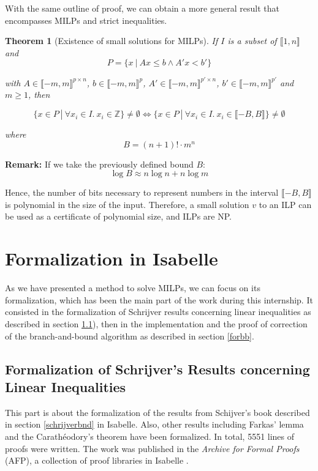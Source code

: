 \documentclass{article}
\newcommand{\ints}{\mathbb{Z}}
\newtheorem{theorem}{Theorem}
\begin{document}
With the same outline of proof, we can obtain a more general result that
encompasses MILPs and strict inequalities. 

\begin{theorem}[Existence of small solutions for MILPs]
  \label{small-milp}
  If $I$ is a subset of $\llbracket 1, n \rrbracket$ and
  $$P = \{x~|~Ax \leqslant b \wedge A'x < b'\}$$
  
  with
  $A \in \llbracket -m, m \rrbracket^{p \times n}$,
  $b \in \llbracket -m, m \rrbracket^p$,
  $A' \in \llbracket -m, m \rrbracket^{p' \times n}$,
  $b' \in \llbracket -m, m \rrbracket^{p'}$ and $m \geqslant 1$, then

  $$\{x \in P~|~\forall x_i \in I.~x_i \in \ints\} \neq \emptyset
      \Longleftrightarrow
    \{x \in P~|~\forall x_i \in I.~x_i \in \llbracket -B, B \rrbracket\}
      \neq \emptyset$$

  where
  $$B = (n + 1)! \cdot m^n$$
\end{theorem}

\textbf{Remark:} If we take the previously defined bound $B$:
$$\log B \approx n \log n + n \log m$$

Hence, the number of bits
necessary to represent numbers in the interval $\llbracket -B, B \rrbracket$
is polynomial in the size of the input. Therefore, a small solution $v$ to
an ILP can be used as a certificate of polynomial size, and ILPs are NP.

\section{Formalization in Isabelle}
As we have presented a method to solve MILPs, we can focus on its
formalization, which has been the main part of the work during this internship.
It consisted in the formalization of Schrijver results concerning linear
inequalities as described in section \ref{forlineq}), then in the
implementation and the proof of correction of the branch-and-bound algorithm
as described in section \ref{forbb}.

\subsection{Formalization of Schrijver's Results concerning Linear
            Inequalities}
\label{forlineq}
This part is about the formalization of the results from Schijver's book
described in section \ref{schrijverbnd} in Isabelle.
Also, other results including Farkas' lemma and the Carathéodory's theorem
have been formalized.
In total, 5551 lines of proofs were written. The work was published in the
\textit{Archive for Formal Proofs} (AFP), a collection of proof libraries in
Isabelle \cite{Linear_Inequalities-AFP}.
\end{document}
